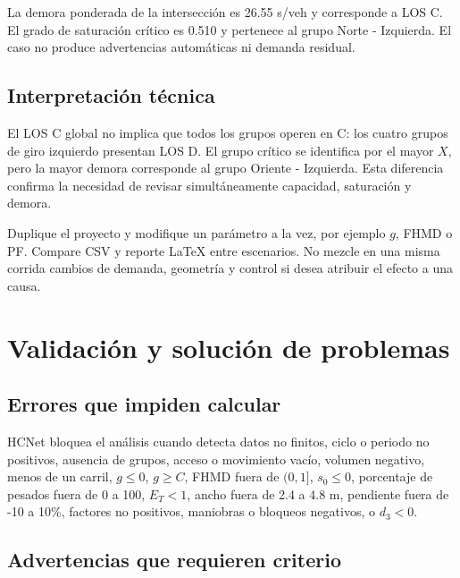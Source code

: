 \documentclass[11pt,letterpaper,oneside,openany]{report}
\begin{document}
\begin{keybox}
La demora ponderada de la intersección es 26.55 s/veh y corresponde a LOS C. El
grado de saturación crítico es 0.510 y pertenece al grupo Norte - Izquierda. El
caso no produce advertencias automáticas ni demanda residual.
\end{keybox}

\section{Interpretación técnica}

El LOS C global no implica que todos los grupos operen en C: los cuatro grupos de
giro izquierdo presentan LOS D. El grupo crítico se identifica por el mayor $X$,
pero la mayor demora corresponde al grupo Oriente - Izquierda. Esta diferencia
confirma la necesidad de revisar simultáneamente capacidad, saturación y demora.

\begin{tipbox}
Duplique el proyecto y modifique un parámetro a la vez, por ejemplo $g$, FHMD o
PF. Compare CSV y reporte LaTeX entre escenarios. No mezcle en una misma corrida
cambios de demanda, geometría y control si desea atribuir el efecto a una causa.
\end{tipbox}

\chapter{Validación y solución de problemas}

\section{Errores que impiden calcular}

HCNet bloquea el análisis cuando detecta datos no finitos, ciclo o periodo no
positivos, ausencia de grupos, acceso o movimiento vacío, volumen negativo,
menos de un carril, $g\leq0$, $g\geq C$, FHMD fuera de $(0,1]$, $s_0\leq0$,
porcentaje de pesados fuera de 0 a 100, $E_T<1$, ancho fuera de 2.4 a 4.8 m,
pendiente fuera de -10 a 10\%, factores no positivos, maniobras o bloqueos
negativos, o $d_3<0$.

\section{Advertencias que requieren criterio}
\end{document}
